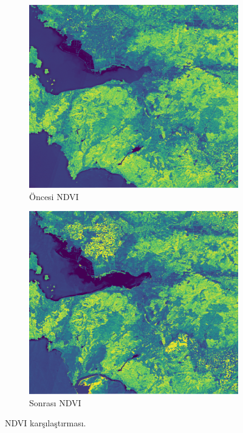 \documentclass[11pt,a4paper]{article}
\begin{document}
\begin{figure}[H]
  \centering
  \begin{subfigure}[b]{0.48\textwidth}
    \centering
    \includegraphics[width=\textwidth]{../results/pre_NDVI.png}
    \caption{Öncesi NDVI}
  \end{subfigure}\hfill
  \begin{subfigure}[b]{0.48\textwidth}
    \centering
    \includegraphics[width=\textwidth]{../results/post_NDVI.png}
    \caption{Sonrası NDVI}
  \end{subfigure}
  \caption{NDVI karşılaştırması.}
  \label{fig:ndvi}
\end{figure}
\FloatBarrier
\end{document}
